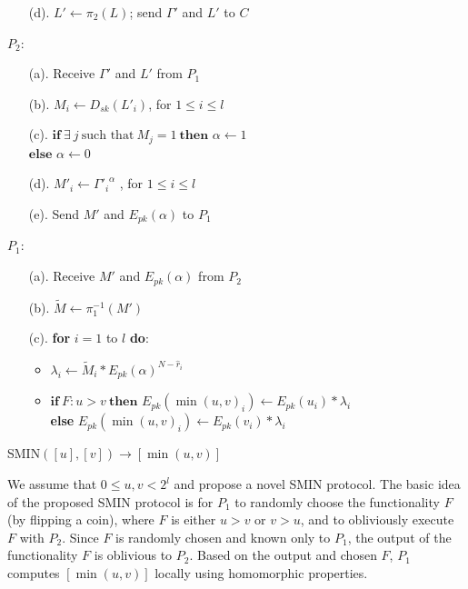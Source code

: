 \documentclass{article}
\begin{document}
\begin{algorithm}[!t]
\begin{algorithmic}[1]
\begin{enumerate}
    \item[(d).]  $L' \gets \pi_2(L)$; send $\Gamma'$ and $L'$ to $C$
\end{enumerate}
\STATE $P_2$:
\begin{enumerate}\itemsep=0pt
        \item[(a).] Receive $\Gamma'$ and $L'$ from $P_1$
        \item[(b).]  $M_i \gets D_{sk}(L'_i)$, for $1 \leq i \leq l$                   
        \item[(c).] $\textbf{if}~\exists~j~\textrm{such that}~M_j = 1 ~\textbf{then}$ $\alpha \gets 1$\\                            
                $\textbf{else}$ $\alpha \gets 0$                     
       \item[(d).] $M'_i \gets {\Gamma'_i}^{\alpha}$ , for $1 \leq i \leq l$                    
       \item[(e).] Send $M'$ and $E_{pk}(\alpha)$ to $P_1$
\end{enumerate}
\STATE $P_1$:
\begin{enumerate}\itemsep=0pt
        \item[(a).] Receive $M'$ and $E_{pk}(\alpha)$ from $P_2$
        \item[(b).] $\widetilde{M} \gets \pi_1^{-1}(M')$  
        \item[(c).] \textbf{for} $i=1$ to $l$ \textbf{do}:
                  \begin{itemize}\itemsep=0pt
                           \item $\lambda_i \gets \widetilde{M}_i\ast E_{pk}(\alpha)^{N - \hat{r}_i}$
                           \item $\textbf{if}~F : u > v ~\textbf{then}$ $E_{pk}(\min(u,v)_i) \gets E_{pk}(u_i)\ast \lambda_i$\\                           
                           \textbf{else} $E_{pk}(\min(u,v)_i) \gets E_{pk}(v_i)\ast \lambda_i$                                                      
                  \end{itemize}  
\end{enumerate}               
\end{algorithmic}
\caption{SMIN$([u], [v]) \rightarrow [\min(u,v)]$}
\label{alg:sm2n}
\end{algorithm}
We assume that $0 \le u,v < 2^l$ and propose a novel 
SMIN protocol. The basic idea of the proposed SMIN protocol is 
for $P_1$ to randomly choose the functionality $F$ (by flipping a coin), where 
$F$ is either $u > v$ or $v > u$, and to obliviously execute $F$ with 
$P_2$. Since $F$ is randomly chosen and known only to $P_1$, the output of 
the functionality $F$ is oblivious to $P_2$. Based on the output and chosen $F$, 
$P_1$ computes $[\min(u, v)]$ locally using homomorphic properties. 
\end{document}
